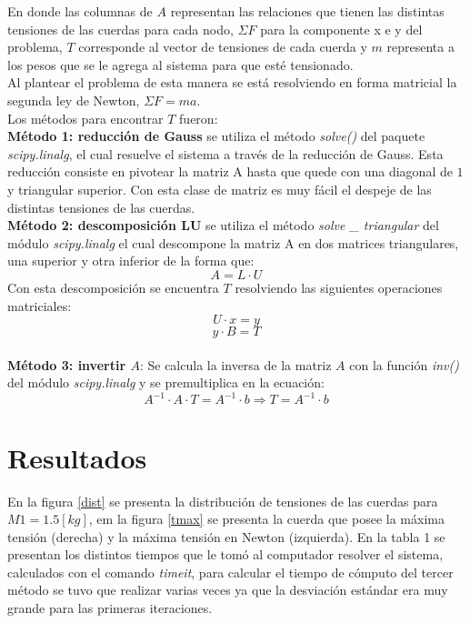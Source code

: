 \documentclass[a4paper, 11pt, spanish]{article}
\begin{document}
En donde las columnas de $A$ representan las relaciones que tienen las distintas tensiones de las cuerdas para cada nodo, $\Sigma F$ para la componente x e y del problema, $T$ corresponde al vector de tensiones de cada cuerda y $m$ representa a los pesos que se le agrega al sistema para que esté tensionado.\\
Al plantear el problema de esta manera se está resolviendo en forma matricial la segunda ley de Newton, $\Sigma F = ma $.\\
Los métodos para encontrar $T$ fueron:\\
\textbf{Método 1: reducción de Gauss} se utiliza el método \textit{solve()} del paquete \textit{scipy.linalg}, el cual resuelve el sistema a través de la reducción de Gauss. Esta reducción consiste en pivotear la matriz A hasta que quede con una diagonal de $1$ y triangular superior. Con esta clase de matriz es muy fácil el despeje de las distintas tensiones de las cuerdas.\\

\textbf{Método 2: descomposición LU} se utiliza el método \textit{solve \_ triangular} del módulo \textit{scipy.linalg} el cual descompone la matriz A en dos matrices triangulares, una superior y otra inferior de la forma que:
\begin{equation}
A = L \cdot U
\end{equation}
Con esta descomposición se encuentra $T$ resolviendo las siguientes operaciones matriciales:
\begin{equation*}
U \cdot x = y 
\end{equation*}
\begin{equation}
y \cdot B = T
\end{equation}
\\

\textbf{Método 3: invertir $A$}: Se calcula la inversa de la matriz $A$ con la función \textit{inv()} del módulo \textit{scipy.linalg} y se premultiplica en la ecuación:
\begin{equation}
A^{-1} \cdot A \cdot T = A^{-1} \cdot b \Rightarrow T = A^{-1} \cdot b
\end{equation}


\section{Resultados}
En la figura \ref{dist} se presenta la distribución de tensiones de las cuerdas para $M1 = 1.5[kg]$, em la figura \ref{tmax} se presenta la cuerda que posee la máxima tensión (derecha) y la máxima tensión en Newton (izquierda). En la tabla 1 se presentan los distintos tiempos que le tomó al computador resolver el sistema, calculados con el comando \textit{timeit}, para calcular el tiempo de cómputo del tercer método se tuvo que realizar varias veces ya que la desviación estándar era muy grande para las primeras iteraciones.\\
\end{document}
